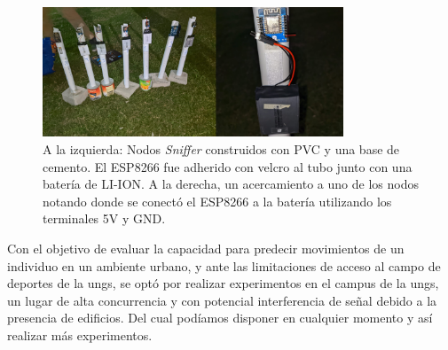 \begin{figure}[!htb]
    \centering
    \includegraphics[width=0.8\textwidth]{Figuras/fieldwork/combined.png}
    \captionsetup{margin=2cm}
    \caption[Postes de Nodo Multilateración]{A la izquierda: Nodos \textit{Sniffer} construidos con PVC y una base de cemento. El ESP8266 fue adherido con velcro al tubo junto con una batería de LI-ION. A la derecha, un acercamiento a uno de los nodos notando donde se conectó el ESP8266 a la batería utilizando los terminales 5V y GND.}
    \label{fig:infra-diagram-arduino}
\end{figure}
Con el objetivo de evaluar la capacidad para predecir movimientos de un individuo en un ambiente urbano, y ante las limitaciones de acceso al campo de deportes de la \acs{ungs}, se optó por realizar experimentos en el campus de la \acs{ungs}, un lugar de alta concurrencia y con potencial interferencia de señal debido a la presencia de edificios. Del cual podíamos disponer en cualquier momento y así realizar más experimentos.

